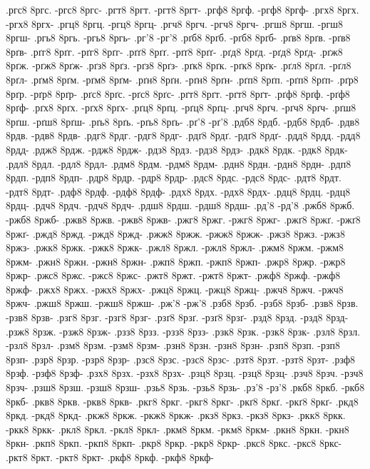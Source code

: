 {.ргс8 8ргс. -ргс8 8ргс-
.ргт8 8ргт. -ргт8 8ргт-
.ргф8 8ргф. -ргф8 8ргф-
.ргх8 8ргх. -ргх8 8ргх-
.ргц8 8ргц. -ргц8 8ргц-
.ргч8 8ргч. -ргч8 8ргч-
.ргш8 8ргш. -ргш8 8ргш-
.ргь8 8ргь. -ргь8 8ргь-
.рг'8 -рг'8
.рґб8 8рґб. -рґб8 8рґб-
.рґв8 8рґв. -рґв8 8рґв-
.рґг8 8рґг. -рґг8 8рґг-
.рґґ8 8рґґ. -рґґ8 8рґґ-
.рґд8 8рґд. -рґд8 8рґд-
.рґж8 8рґж. -рґж8 8рґж-
.рґз8 8рґз. -рґз8 8рґз-
.рґк8 8рґк. -рґк8 8рґк-
.рґл8 8рґл. -рґл8 8рґл-
.рґм8 8рґм. -рґм8 8рґм-
.рґн8 8рґн. -рґн8 8рґн-
.рґп8 8рґп. -рґп8 8рґп-
.рґр8 8рґр. -рґр8 8рґр-
.рґс8 8рґс. -рґс8 8рґс-
.рґт8 8рґт. -рґт8 8рґт-
.рґф8 8рґф. -рґф8 8рґф-
.рґх8 8рґх. -рґх8 8рґх-
.рґц8 8рґц. -рґц8 8рґц-
.рґч8 8рґч. -рґч8 8рґч-
.рґш8 8рґш. -рґш8 8рґш-
.рґь8 8рґь. -рґь8 8рґь-
.рґ'8 -рґ'8
.рдб8 8рдб. -рдб8 8рдб-
.рдв8 8рдв. -рдв8 8рдв-
.рдг8 8рдг. -рдг8 8рдг-
.рдґ8 8рдґ. -рдґ8 8рдґ-
.рдд8 8рдд. -рдд8 8рдд-
.рдж8 8рдж. -рдж8 8рдж-
.рдз8 8рдз. -рдз8 8рдз-
.рдк8 8рдк. -рдк8 8рдк-
.рдл8 8рдл. -рдл8 8рдл-
.рдм8 8рдм. -рдм8 8рдм-
.рдн8 8рдн. -рдн8 8рдн-
.рдп8 8рдп. -рдп8 8рдп-
.рдр8 8рдр. -рдр8 8рдр-
.рдс8 8рдс. -рдс8 8рдс-
.рдт8 8рдт. -рдт8 8рдт-
.рдф8 8рдф. -рдф8 8рдф-
.рдх8 8рдх. -рдх8 8рдх-
.рдц8 8рдц. -рдц8 8рдц-
.рдч8 8рдч. -рдч8 8рдч-
.рдш8 8рдш. -рдш8 8рдш-
.рд'8 -рд'8
.ржб8 8ржб. -ржб8 8ржб-
.ржв8 8ржв. -ржв8 8ржв-
.ржг8 8ржг. -ржг8 8ржг-
.ржґ8 8ржґ. -ржґ8 8ржґ-
.ржд8 8ржд. -ржд8 8ржд-
.ржж8 8ржж. -ржж8 8ржж-
.ржз8 8ржз. -ржз8 8ржз-
.ржк8 8ржк. -ржк8 8ржк-
.ржл8 8ржл. -ржл8 8ржл-
.ржм8 8ржм. -ржм8 8ржм-
.ржн8 8ржн. -ржн8 8ржн-
.ржп8 8ржп. -ржп8 8ржп-
.ржр8 8ржр. -ржр8 8ржр-
.ржс8 8ржс. -ржс8 8ржс-
.ржт8 8ржт. -ржт8 8ржт-
.ржф8 8ржф. -ржф8 8ржф-
.ржх8 8ржх. -ржх8 8ржх-
.ржц8 8ржц. -ржц8 8ржц-
.ржч8 8ржч. -ржч8 8ржч-
.ржш8 8ржш. -ржш8 8ржш-
.рж'8 -рж'8
.рзб8 8рзб. -рзб8 8рзб-
.рзв8 8рзв. -рзв8 8рзв-
.рзг8 8рзг. -рзг8 8рзг-
.рзґ8 8рзґ. -рзґ8 8рзґ-
.рзд8 8рзд. -рзд8 8рзд-
.рзж8 8рзж. -рзж8 8рзж-
.рзз8 8рзз. -рзз8 8рзз-
.рзк8 8рзк. -рзк8 8рзк-
.рзл8 8рзл. -рзл8 8рзл-
.рзм8 8рзм. -рзм8 8рзм-
.рзн8 8рзн. -рзн8 8рзн-
.рзп8 8рзп. -рзп8 8рзп-
.рзр8 8рзр. -рзр8 8рзр-
.рзс8 8рзс. -рзс8 8рзс-
.рзт8 8рзт. -рзт8 8рзт-
.рзф8 8рзф. -рзф8 8рзф-
.рзх8 8рзх. -рзх8 8рзх-
.рзц8 8рзц. -рзц8 8рзц-
.рзч8 8рзч. -рзч8 8рзч-
.рзш8 8рзш. -рзш8 8рзш-
.рзь8 8рзь. -рзь8 8рзь-
.рз'8 -рз'8
.ркб8 8ркб. -ркб8 8ркб-
.ркв8 8ркв. -ркв8 8ркв-
.ркг8 8ркг. -ркг8 8ркг-
.ркґ8 8ркґ. -ркґ8 8ркґ-
.ркд8 8ркд. -ркд8 8ркд-
.ркж8 8ркж. -ркж8 8ркж-
.ркз8 8ркз. -ркз8 8ркз-
.ркк8 8ркк. -ркк8 8ркк-
.ркл8 8ркл. -ркл8 8ркл-
.ркм8 8ркм. -ркм8 8ркм-
.ркн8 8ркн. -ркн8 8ркн-
.ркп8 8ркп. -ркп8 8ркп-
.ркр8 8ркр. -ркр8 8ркр-
.ркс8 8ркс. -ркс8 8ркс-
.ркт8 8ркт. -ркт8 8ркт-
.ркф8 8ркф. -ркф8 8ркф-
}
